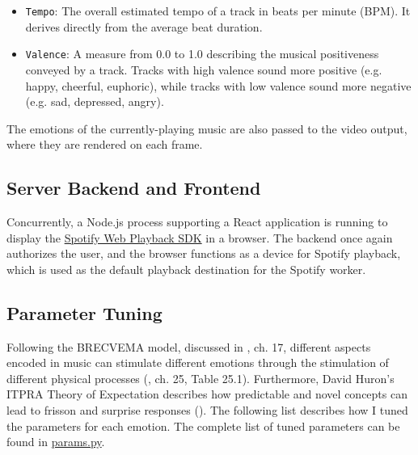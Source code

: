 \documentclass{article}
\renewcommand{\_}[1]{\underline{ #1 }}
\theoremstyle{definition}
\begin{document}
\begin{itemize}
    \item \texttt{Tempo}: The overall estimated tempo of a track in beats per minute (BPM). It derives directly from the average beat duration.
    \item \texttt{Valence}: A measure from 0.0 to 1.0 describing the musical positiveness conveyed by a track. Tracks with high valence sound more positive (e.g. happy, cheerful, euphoric), while tracks with low valence sound more negative (e.g. sad, depressed, angry).
\end{itemize}

The emotions of the currently-playing music are also passed to the video output, where they are rendered on each frame.

\subsection[Server Backend and Frontend]{Server Backend and Frontend}

Concurrently, a Node.js process supporting a React application is running to display the \href{https://developer.spotify.com/documentation/web-playback-sdk/}{Spotify Web Playback SDK} in a browser. The backend once again authorizes the user, and the browser functions as a device for Spotify playback, which is used as the default playback destination for the Spotify worker. 

\subsection[Parameter Tuning]{Parameter Tuning}
\label{Parameter Tuning}

Following the BRECVEMA model, discussed in \cite{juslin2019}, ch. 17, different aspects encoded in music can stimulate different emotions through the stimulation of different physical processes (\cite{juslin2019}, ch. 25, Table 25.1). Furthermore,  David Huron's ITPRA Theory of Expectation describes how predictable and novel concepts can lead to frisson and surprise responses (\cite{huron2006}). The following list describes how I tuned the parameters for each emotion. The complete list of tuned parameters can be found in \href{https://github.com/as4mo3/face-the-music/blob/master/params.py}{params.py}. 
\end{document}
